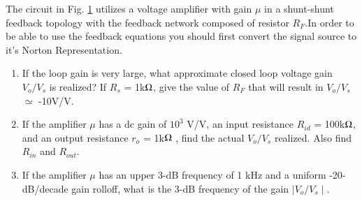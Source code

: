 The circuit in Fig. \ref{fig:ee18btech11011_ee18btech11011_original_circuit} utilizes a voltage amplifier with gain $\mu$ in a shunt-shunt feedback topology with the feedback network composed of resistor $R_{F}$.In order to be able to use the feedback equations you should first convert the signal source to it's Norton Representation.
\begin{figure}[!ht]
	\begin{center}
		\resizebox{\columnwidth}{!}{}
	\end{center}
\caption{}
\label{fig:ee18btech11011_ee18btech11011_original_circuit}
\end{figure}

\begin{enumerate}
    \item If the loop gain is very large, what approximate closed loop voltage gain $V_{o}/V_{s}$ is realized? If $R_{s}$ = 1k$\ohm$, give the value of $R_{F}$ that will result in $V_{o}/V_{s}$ $\simeq$ -10V/V.
    \item If the amplifier $\mu$ has a dc gain of $10^{3}$ V/V, an input
    resistance $R_{i d}$ = 100k$\ohm$, and an output resistance $r_{o}$ = 1k$\ohm$
    , find the actual $V_{o}/V_{s}$ realized. Also find $R_{i n}$ and $R_{o u t}$.
    \item If the amplifier $\mu$ has an upper 3-dB frequency of 1 kHz and a uniform -20-dB/decade gain rolloff, what is the 3-dB frequency of the gain $\mid V_{o}/V_{s} \mid$.
\end{enumerate}

